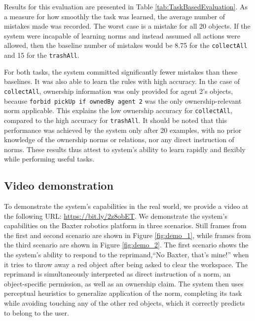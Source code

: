 \documentclass[letterpaper]{article} %
\begin{document}
Results for this evaluation are presented in Table \ref{tab:TaskBasedEvaluation}. As a measure for how smoothly the task was learned, the average number of mistakes made was recorded. The worst case is a mistake for all $20$ objects. If the system were incapable of learning norms and instead assumed all actions were allowed, then the baseline number of mistakes would be 8.75 for the \texttt{\small collectAll} and 15 for the \texttt{\small trashAll}.

For both tasks, the system committed significantly fewer mistakes than these baselines. It was also able to learn the rules with high accuracy. In the case of \texttt{\small collectAll}, ownership information was only provided for agent 2's objects, because \texttt{\small forbid pickUp if ownedBy agent 2} was the only ownership-relevant norm applicable. This explains the low ownership accuracy for \texttt{\small collectAll}, compared to the high accuracy for \texttt{\small trashAll}. It should be noted that this performance was achieved by the system only after 20 examples, with no prior knowledge of the ownership norms or relations, nor any direct instruction of norms. These results thus attest to system's ability to learn rapidly and flexibly while performing useful tasks.

\vspace{-1.67mm}
\subsection{Video demonstration}

To demonstrate the system's capabilities in the real world, we provide a video at the following URL: \url{https://bit.ly/2z8obET}. We demonstrate the system's capabilities on the Baxter robotics platform in three scenarios. Still frames from the first and second scenario are shown in Figure \ref{fig:demo_1}, while frames from the third scenario are shown in Figure \ref{fig:demo_2}.  The first scenario shows the the system's ability to respond to the reprimand,``No Baxter, that's mine!'' when it tries to throw away a red object after being asked to clear the workspace. The reprimand is simultaneously interpreted as direct instruction of a norm, an object-specific permission, as well as an ownership claim. The system then uses perceptual heuristics to generalize application of the norm, completing its task while avoiding touching any of the other red objects, which it correctly predicts to belong to the user.
\end{document}
